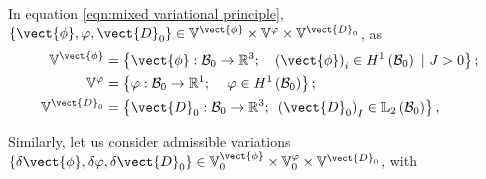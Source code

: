 In equation \eqref{eqn:mixed variational principle},  $\{\vect{\phi},\varphi,\vect{D}_0\}\in \mathbb{V}^{\vect{\phi}}\times\mathbb{V}^{\varphi}\times\mathbb{V}^{\vect{D}_0}$, as
%
%
\begin{equation}\label{eqn:functional spaces}
\begin{aligned}
\mathbb{V}^{\vect{\phi}} & = \left\{\vect{\phi}:\mathcal{B}_0\rightarrow \mathbb{R}^3;\,\,\,\,\,\,\left(\vect{\phi}\right)_{i}\in H^1\left(\mathcal{B}_0\right)\,\,\vert\,\, J>0 \right\};\\
%
\mathbb{V}^{{\varphi}} & = \left\{\varphi:\mathcal{B}_0\rightarrow\mathbb{R}^1;\,\,\,\,\,\,\,{\varphi}\in H^1\left(\mathcal{B}_0\right)\right\};\\
%
\mathbb{V}^{\vect{D}_0} & = \left\{\vect{D}_0:\mathcal{B}_0\rightarrow\mathbb{R}^3;\,\,\,\left(\vect{D}_0\right)_{I}\in \mathbb{L}_2\left(\mathcal{B}_0\right)\right\},
%
\end{aligned}
\end{equation}
%

Similarly, let us consider admissible variations $\{\delta\vect{\phi},\delta\varphi,\delta\vect{D}_0\}\in \mathbb{V}_0^{\vect{\phi}}\times\mathbb{V}_0^{\varphi}\times\mathbb{V}^{\vect{D}_0}$, with 
%
%



